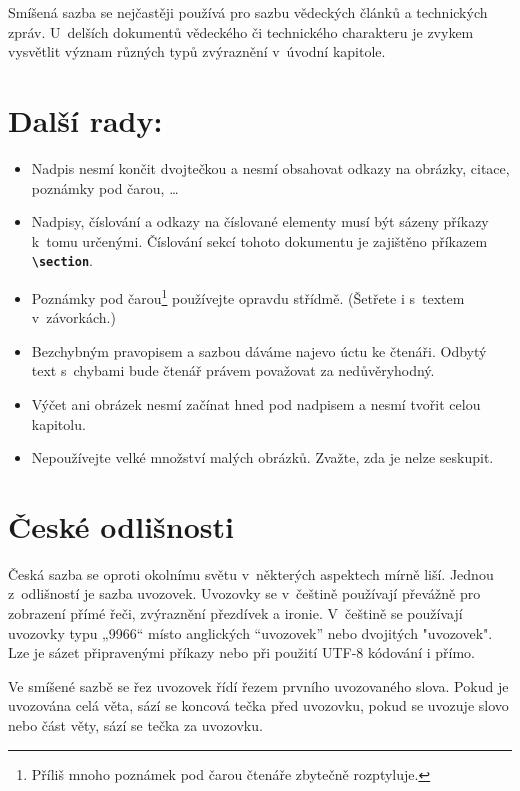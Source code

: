 \documentclass[twocolumn]{article}
\begin{document}
Smíšená sazba se nejčastěji používá pro sazbu vědeckých článků a technických zpráv. U~delších dokumentů
vědeckého či technického charakteru je zvykem vysvětlit
význam různých typů zvýraznění v~úvodní kapitole.

  
  
  \section{Další rady:}
  \begin{itemize}
  \item Nadpis nesmí končit dvojtečkou a nesmí obsahovat
odkazy na obrázky, citace, poznámky pod čarou, \ldots 
\item Nadpisy, číslování a odkazy na číslované elementy
musí být sázeny příkazy k~tomu určenými. Číslování sekcí tohoto dokumentu je zajištěno příkazem
 \textbf{\texttt{\textbackslash section}}.
\item Poznámky pod čarou\footnote{Příliš mnoho poznámek pod čarou čtenáře zbytečně rozptyluje.} používejte opravdu střídmě. (Šetřete i s~textem v~závorkách.)
\item Bezchybným pravopisem a sazbou dáváme najevo úctu ke čtenáři. Odbytý text s~chybami bude čtenář právem považovat za nedůvěryhodný.
\item Výčet ani obrázek nesmí začínat hned pod nadpisem a nesmí tvořit celou kapitolu.
\item Nepoužívejte velké množství malých obrázků. Zvažte, zda je nelze seskupit.
\end{itemize}
  \section{České odlišnosti}
  Česká sazba se oproti okolnímu světu v~některých aspektech mírně liší. Jednou z~odlišností je sazba uvozovek. Uvozovky se v~češtině používají převážně pro zobrazení přímé řeči, zvýraznění přezdívek a ironie. V~češtině se používají uvozovky typu „9966“ místo anglických ``uvozovek'' nebo
dvojitých "uvozovek". Lze je sázet připravenými příkazy nebo při použití UTF-8 kódování i přímo.\par

Ve smíšené sazbě se řez uvozovek řídí řezem prvního uvozovaného slova. Pokud je uvozována celá věta, sází se koncová tečka před uvozovku, pokud se uvozuje slovo nebo část věty, sází se tečka za uvozovku.\par
\end{document}
